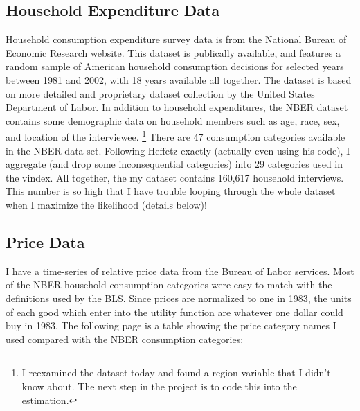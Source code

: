 \documentclass{article}
\begin{document}
\subsection{Household Expenditure Data}
Household consumption expenditure survey  data is from the National Bureau of Economic Research website.    
This dataset is publically available, and features a random sample of American household consumption decisions for selected years between 1981 and 2002, with 18 years available all together.  
The dataset is based on more detailed and proprietary dataset collection by the United States Department of Labor. 
In addition to household expenditures, the NBER dataset contains some demographic data on household members such as age, race, sex, and location of the interviewee.  
\footnote{I reexamined the dataset today and found a region variable that I didn't know about.  The next step in the project is to code this into the estimation.}
There are 47 consumption categories available in the NBER data set.
Following Heffetz exactly (actually even using his code), I aggregate (and drop some inconsequential categories) into 29 categories used in the vindex.
All together, the my dataset contains 160,617 household interviews.
This number is so high that I have trouble looping through the whole dataset when I maximize the likelihood (details below)!

\subsection{Price Data}
I have a time-series of relative price data from the Bureau of Labor services.
Most of the NBER household consumption categories were easy to match with the definitions used by the BLS.   
Since prices are normalized to one in 1983, the units of each good which enter into the utility function are whatever one dollar could buy in 1983.
The following page is a table showing the price category names I used compared with the NBER consumption categories:
\end{document}
